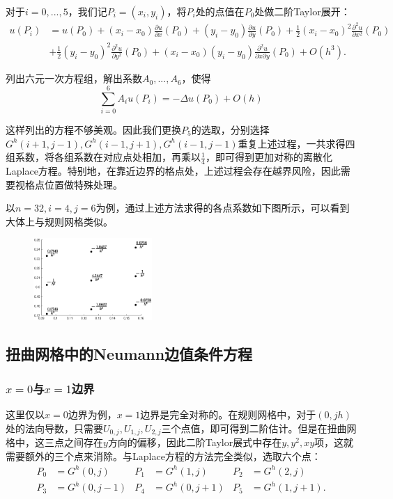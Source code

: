 \documentclass[lang=cn,10pt]{elegantbook}
\begin{document}
对于$i=0,...,5$，我们记$P_i=(x_i,y_i)$，将$P_i$处的点值在$P_0$处做二阶Taylor展开：
\begin{align*}
  u(P_i)&=u(P_0)+(x_i-x_0)\frac{\partial u}{\partial x}(P_0)+(y_i-y_0)\frac{\partial u}{\partial y}(P_0)
  +\frac{1}{2}(x_i-x_0)^2\frac{\partial^2 u}{\partial x^2}(P_0) \\
  & +\frac{1}{2}(y_i-y_0)^2\frac{\partial^2 u}{\partial y^2}(P_0)
  +(x_i-x_0)(y_i-y_0)\frac{\partial^2 u}{\partial x \partial y}(P_0)+O(h^3).
\end{align*}

列出六元一次方程组，解出系数$A_0,...,A_6$，使得
\begin{equation*}
  \sum_{i=0}^6 A_iu(P_i)=-\Delta u(P_0)+O(h)
\end{equation*}

这样列出的方程不够美观。因此我们更换$P_5$的选取，分别选择$G^h(i+1,j-1),G^h(i-1,j+1),G^h(i-1,j-1)$重复上述过程，一共求得四组系数，将各组系数在对应点处相加，再乘以$\frac{1}{4}$，即可得到更加对称的离散化Laplace方程。特别地，在靠近边界的格点处，上述过程会存在越界风险，因此需要视格点位置做特殊处理。

以$n=32,i=4,j=6$为例，通过上述方法求得的各点系数如下图所示，可以看到大体上与规则网格类似。

\begin{figure}[H]
  \centering
  \includegraphics[width=0.4\textwidth]{figure/3-2.eps}
\end{figure}

\subsection{扭曲网格中的Neumann边值条件方程}

\subsubsection{$x=0$与$x=1$边界}

这里仅以$x=0$边界为例，$x=1$边界是完全对称的。在规则网格中，对于$(0,jh)$处的法向导数，只需要$U_{0,j},U_{1,j},U_{2,j}$三个点值，即可得到二阶估计。但是在扭曲网格中，这三点之间存在$y$方向的偏移，因此二阶Taylor展式中存在$y,y^2,xy$项，这就需要额外的三个点来消除。与Laplace方程的方法完全类似，选取六个点：
\begin{align*}
  P_0&=G^h(0,j) & P_1&=G^h(1,j) & P_2&=G^h(2,j)\\
  P_3&=G^h(0,j-1) & P_4&=G^h(0,j+1) & P_5&=G^h(1,j+1).
\end{align*}
\end{document}
